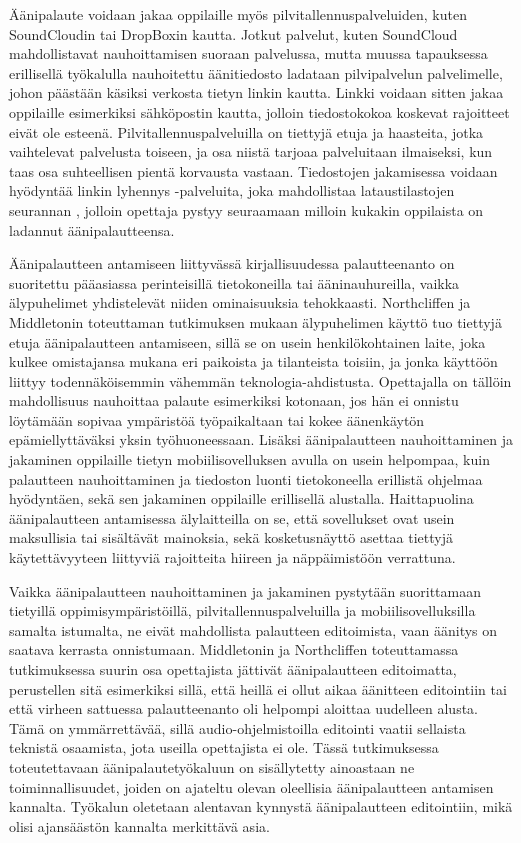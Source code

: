 \documentclass[utf8]{gradu3}
\begin{document}
Äänipalaute voidaan jakaa oppilaille myös pilvitallennuspalveluiden, kuten SoundCloudin tai DropBoxin kautta. Jotkut palvelut, kuten SoundCloud mahdollistavat nauhoittamisen suoraan palvelussa, mutta muussa tapauksessa erillisellä työkalulla nauhoitettu äänitiedosto ladataan pilvipalvelun palvelimelle, johon päästään käsiksi verkosta tietyn linkin kautta. Linkki voidaan sitten jakaa oppilaille esimerkiksi sähköpostin kautta, jolloin tiedostokokoa koskevat rajoitteet eivät ole esteenä. Pilvitallennuspalveluilla on tiettyjä etuja ja haasteita, jotka vaihtelevat palvelusta toiseen, ja osa niistä tarjoaa palveluitaan ilmaiseksi, kun taas osa suhteellisen pientä korvausta vastaan. Tiedostojen jakamisessa voidaan hyödyntää linkin lyhennys -palveluita, joka mahdollistaa lataustilastojen seurannan \parencite[][]{engaging}, jolloin opettaja pystyy seuraamaan milloin kukakin oppilaista on ladannut äänipalautteensa.

Äänipalautteen antamiseen liittyvässä kirjallisuudessa palautteenanto on suoritettu pääasiassa perinteisillä tietokoneilla tai ääninauhureilla, vaikka älypuhelimet yhdistelevät niiden ominaisuuksia tehokkaasti. Northcliffen ja Middletonin \parencite{smartphone} toteuttaman tutkimuksen mukaan älypuhelimen käyttö tuo tiettyjä etuja äänipalautteen antamiseen, sillä se on usein henkilökohtainen laite, joka kulkee omistajansa mukana eri paikoista ja tilanteista toisiin, ja jonka käyttöön liittyy todennäköisemmin vähemmän teknologia-ahdistusta. Opettajalla on tällöin mahdollisuus nauhoittaa palaute esimerkiksi kotonaan, jos hän ei onnistu löytämään sopivaa ympäristöä työpaikaltaan tai kokee äänenkäytön epämiellyttäväksi yksin työhuoneessaan. Lisäksi äänipalautteen nauhoittaminen ja jakaminen oppilaille tietyn mobiilisovelluksen avulla on usein helpompaa, kuin palautteen nauhoittaminen ja tiedoston luonti tietokoneella erillistä ohjelmaa hyödyntäen, sekä sen jakaminen oppilaille erillisellä alustalla. Haittapuolina äänipalautteen antamisessa älylaitteilla on se, että sovellukset ovat usein maksullisia tai sisältävät mainoksia, sekä kosketusnäyttö asettaa tiettyjä käytettävyyteen liittyviä rajoitteita hiireen ja näppäimistöön verrattuna.

Vaikka äänipalautteen nauhoittaminen ja jakaminen pystytään suorittamaan tietyillä oppimisympäristöillä, pilvitallennuspalveluilla ja mobiilisovelluksilla samalta istumalta, ne eivät mahdollista palautteen editoimista, vaan äänitys on saatava kerrasta onnistumaan. Middletonin ja Northcliffen \parencite{principles} toteuttamassa tutkimuksessa suurin osa opettajista jättivät äänipalautteen editoimatta, perustellen sitä esimerkiksi sillä, että heillä ei ollut aikaa äänitteen editointiin tai että virheen sattuessa palautteenanto oli helpompi aloittaa uudelleen alusta. Tämä on ymmärrettävää, sillä audio-ohjelmistoilla editointi vaatii sellaista teknistä osaamista, jota useilla opettajista ei ole. Tässä tutkimuksessa toteutettavaan äänipalautetyökaluun on sisällytetty ainoastaan ne toiminnallisuudet, joiden on ajateltu olevan oleellisia äänipalautteen antamisen kannalta. Työkalun oletetaan alentavan kynnystä äänipalautteen editointiin, mikä olisi ajansäästön kannalta merkittävä asia.
\end{document}
